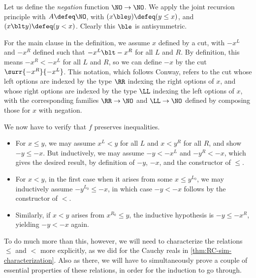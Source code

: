 \begin{eg}
  Let us define the \emph{negation} function $\NO\to\NO$.
  We apply the joint recursion principle with $A\defeq\NO$, with $(x\ble y)\defeq (y\le x)$, and $(x\blt y)\defeq (y< x)$.
  Clearly this $\ble$ is antisymmetric.

  For the main clause in the definition, we assume $x$ defined by a cut, with $-x^L$ and $-x^R$ defined such that $-x^L \blt -x^R$ for all $L$ and $R$.
  By definition, this means $-x^R< -x^L$ for all $L$ and $R$, so we can define $-x$ by the cut $\surr{-x^R}{-x^L}$.
  This notation, which follows Conway, refers to the cut whose left options are indexed by the type $\RR$ indexing the right options of $x$, and whose right options are indexed by the type $\LL$ indexing the left options of $x$, with the corresponding families $\RR\to\NO$ and $\LL\to\NO$ defined by composing those for $x$ with negation.

  We now have to verify that $f$ preserves inequalities.
  \begin{itemize}
  \item For $x\le y$, we may assume $x^L<y$ for all $L$ and $x < y^R$ for all $R$, and show $-y\le -x$.
    But inductively, we may assume $-y <-x^L$ and $-y^R<-x$, which gives the desired result, by definition of $-y$, $-x$, and the constructor of $\le$.
  \item For $x<y$, in the first case when it arises from some $x\le y^{L_0}$, we may inductively assume $-y^{L_0} \le -x$, in which case $-y<-x$ follows by the constructor of $<$.
  \item Similarly, if $x<y$ arises from $x^{R_0}\le y$, the inductive hypothesis is $-y \le -x^R$, yielding $-y<-x$ again.
  \end{itemize}
\end{eg}

To do much more than this, however, we will need to characterize the relations $\le$ and $<$ more explicitly, as we did for the Cauchy reals in \cref{thm:RC-sim-characterization}.
Also as there, we will have to simultaneously prove a couple of essential properties of these relations, in order for the induction to go through.

